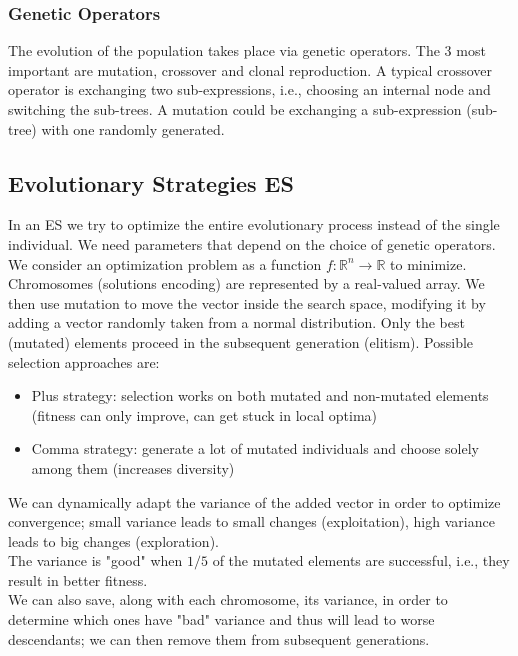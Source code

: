 \subsubsection{Genetic Operators}
The evolution of the population takes place via genetic operators. The 3 most important are mutation, crossover and clonal reproduction. A typical crossover operator is exchanging two sub-expressions, i.e., choosing an internal node and switching the sub-trees. A mutation could be exchanging a sub-expression (sub-tree) with one randomly generated.\\

\subsection{Evolutionary Strategies ES}

In an ES we try to optimize the entire evolutionary process instead of the single individual. We need parameters that depend on the choice of genetic operators.\\
We consider an optimization problem as a function $f: \mathbb{R}^n \rightarrow \mathbb{R}$ to minimize. Chromosomes (solutions encoding) are represented by a real-valued array. We then use mutation to move the vector inside the search space, modifying it by adding a vector randomly taken from a normal distribution. Only the best (mutated) elements proceed in the subsequent generation (elitism). Possible selection approaches are:
\begin{itemize}
	\item Plus strategy: selection works on both mutated and non-mutated elements (fitness can only improve, can get stuck in local optima)
	\item Comma strategy: generate a lot of mutated individuals and choose solely among them (increases diversity)
\end{itemize}

We can dynamically adapt the variance of the added vector in order to optimize convergence; small variance leads to small changes (exploitation), high variance leads to big changes (exploration). \\

The variance is "good" when $1/5$ of the mutated elements are successful, i.e., they result in better fitness.\\
We can also save, along with each chromosome, its variance, in order to determine which ones have "bad" variance and thus will lead to worse descendants; we can then remove them from subsequent generations.\\

